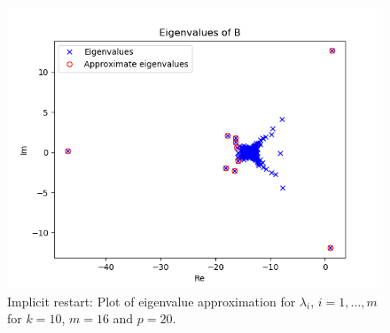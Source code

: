 \begin{figure}[h!]
\centering
\includegraphics[scale=0.8]{../task7/task7b3_k10m16p20.png}
\caption{Implicit restart: Plot of eigenvalue approximation for $\lambda_{i}$, $i = 1,\ldots,m$ for $k = 10$, $m=16$ and $p = 20$.}
\label{fig:task7b2k10}
\end{figure}






%
%

